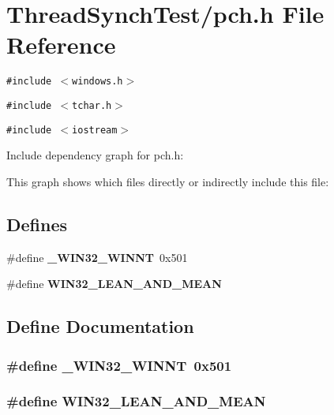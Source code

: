 \section{Thread\-Synch\-Test/pch.h File Reference}
\label{pch_8h}
{\tt \#include $<$windows.h$>$}\par
{\tt \#include $<$tchar.h$>$}\par
{\tt \#include $<$iostream$>$}\par


Include dependency graph for pch.h:

This graph shows which files directly or indirectly include this file:\subsection*{Defines}
\begin{CompactItemize}
\item 
\#define {\bf \_\-WIN32\_\-WINNT}~0x501
\item 
\#define {\bf WIN32\_\-LEAN\_\-AND\_\-MEAN}
\end{CompactItemize}


\subsection{Define Documentation}
\subsubsection{\setlength{\rightskip}{0pt plus 5cm}\#define \_\-WIN32\_\-WINNT~0x501}\label{pch_8h_c50762666aa00bd3a4308158510f1748}


\subsubsection{\setlength{\rightskip}{0pt plus 5cm}\#define WIN32\_\-LEAN\_\-AND\_\-MEAN}\label{pch_8h_c7bef5d85e3dcd73eef56ad39ffc84a9}


